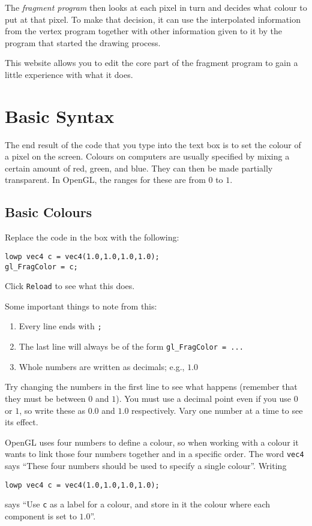 \documentclass[
  html5,%
  mathml,%
  use filename%
]{internet}
\makeatletter
\let\prev@sec=\section
\renewcommand\section{\clearpage\prev@sec}
\makeatother
\begin{document}
The \emph{fragment program} then looks at each pixel in turn and decides what colour to put at that pixel.
To make that decision, it can use the interpolated information from the vertex program together with other information given to it by the program that started the drawing process.

This website allows you to edit the core part of the fragment program to gain a little experience with what it does. 

\section{Basic Syntax}

The end result of the code that you type into the text box is to set the colour of a pixel on the screen.
Colours on computers are usually specified by mixing a certain amount of red, green, and blue.
They can then be made partially transparent.
In OpenGL, the ranges for these are from \(0\) to \(1\).

\subsection{Basic Colours}

Replace the code in the box with the following:

\begin{tcolorbox}
\begin{verbatim}
lowp vec4 c = vec4(1.0,1.0,1.0,1.0);
gl_FragColor = c;
\end{verbatim}
\end{tcolorbox}

Click \texttt{Reload} to see what this does.

Some important things to note from this:
%
\begin{enumerate}
\item Every line ends with \verb+;+
\item The last line will always be of the form \verb+gl_FragColor = ...+
\item Whole numbers are written as decimals; e.g., \(1.0\)
\end{enumerate}

Try changing the numbers in the first line to see what happens (remember that they must be between \(0\) and \(1\)).
You must use a decimal point even if you use \(0\) or \(1\), so write these as \(0.0\) and \(1.0\) respectively.
Vary one number at a time to see its effect.

\begin{tcolorbox}
OpenGL uses four numbers to define a colour, so when working with a colour it wants to link those four numbers together and in a specific order.
The word \verb+vec4+ says ``These four numbers should be used to specify a single colour''.
Writing
%
\begin{verbatim}
lowp vec4 c = vec4(1.0,1.0,1.0,1.0);
\end{verbatim}
%
says ``Use \verb+c+ as a label for a colour, and store in it the colour where each component is set to \(1.0\)''.
\end{tcolorbox}
\end{document}
